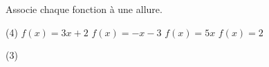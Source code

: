 %
%
    Associe chaque fonction à une allure.
    \begin{tasks}(4)
        \task $f(x) = 3x+2$
        \task $f(x) = -x - 3$
        \task $f(x) = 5x$
        \task $f(x) = 2$
    \end{tasks}

    \begin{tasks}[label=\fbox{\arabic*}, label-width=15pt](3)
        \task 
        \task 
        \task 
        \task 
        \task 
        \task 
    \end{tasks}
